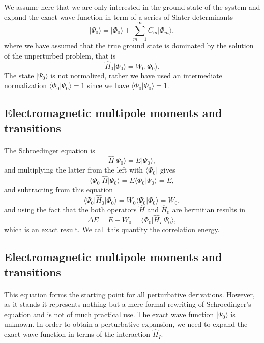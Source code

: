 \documentclass[%
oneside,                 %
final,                   %
10pt]{article}
\begin{document}
We assume here that we are only interested in the ground state of the system and 
expand the exact wave function in term of a series of Slater determinants
\[
\vert \Psi_0\rangle = \vert \Phi_0\rangle + \sum_{m=1}^{\infty}C_m\vert \Phi_m\rangle,
\]
where we have assumed that the true ground state is dominated by the 
solution of the unperturbed problem, that is
\[
\hat{H}_0\vert \Phi_0\rangle= W_0\vert \Phi_0\rangle.
\]
The state $\vert \Psi_0\rangle$ is not normalized, rather we have used an intermediate 
normalization $\langle \Phi_0 \vert \Psi_0\rangle=1$ since we have $\langle \Phi_0\vert \Phi_0\rangle=1$.



\subsection{Electromagnetic multipole moments and transitions}

\paragraph{}
The Schroedinger equation is
\[
\hat{H}\vert \Psi_0\rangle = E\vert \Psi_0\rangle,
\]
and multiplying the latter from the left with $\langle \Phi_0\vert $ gives
\[
\langle \Phi_0\vert \hat{H}\vert \Psi_0\rangle = E\langle \Phi_0\vert \Psi_0\rangle=E,
\]
and subtracting from this equation
\[
\langle \Psi_0\vert \hat{H}_0\vert \Phi_0\rangle= W_0\langle \Psi_0\vert \Phi_0\rangle=W_0,
\]
and using the fact that the both operators $\hat{H}$ and $\hat{H}_0$ are hermitian 
results in
\[
\Delta E=E-W_0=\langle \Phi_0\vert \hat{H}_I\vert \Psi_0\rangle,
\]
which is an exact result. We call this quantity the correlation energy.



\subsection{Electromagnetic multipole moments and transitions}

\paragraph{}
This equation forms the starting point for all perturbative derivations. However,
as it stands it represents nothing but a mere formal rewriting of Schroedinger's equation and is not of much practical use. The exact wave function $\vert \Psi_0\rangle$ is unknown. In order to obtain a perturbative expansion, we need to expand the exact wave function in terms of the interaction $\hat{H}_I$. 
\end{document}
